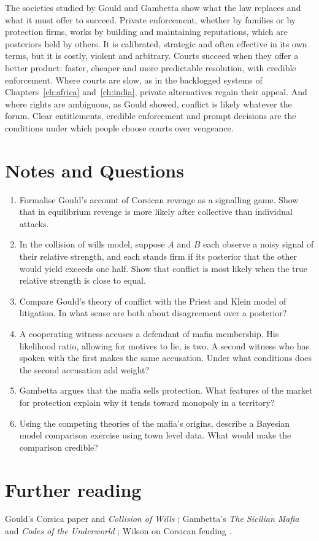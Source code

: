 The societies studied by Gould and Gambetta show what the law replaces and what it must offer to succeed. Private enforcement, whether by families or by protection firms, works by building and maintaining reputations, which are posteriors held by others. It is calibrated, strategic and often effective in its own terms, but it is costly, violent and arbitrary. Courts succeed when they offer a better product: faster, cheaper and more predictable resolution, with credible enforcement. Where courts are slow, as in the backlogged systems of Chapters~\ref{ch:africa} and~\ref{ch:india}, private alternatives regain their appeal. And where rights are ambiguous, as Gould showed, conflict is likely whatever the forum. Clear entitlements, credible enforcement and prompt decisions are the conditions under which people choose courts over vengeance.

\section*{Notes and Questions}
\begin{enumerate}[label=\arabic*.]
\item Formalise Gould's account of Corsican revenge as a signalling game. Show that in equilibrium revenge is more likely after collective than individual attacks.
\item In the collision of wills model, suppose $A$ and $B$ each observe a noisy signal of their relative strength, and each stands firm if its posterior that the other would yield exceeds one half. Show that conflict is most likely when the true relative strength is close to equal.
\item Compare Gould's theory of conflict with the Priest and Klein model of litigation. In what sense are both about disagreement over a posterior?
\item A cooperating witness accuses a defendant of mafia membership. His likelihood ratio, allowing for motives to lie, is two. A second witness who has spoken with the first makes the same accusation. Under what conditions does the second accusation add weight?
\item Gambetta argues that the mafia sells protection. What features of the market for protection explain why it tends toward monopoly in a territory?
\item Using the competing theories of the mafia's origins, describe a Bayesian model comparison exercise using town level data. What would make the comparison credible?
\end{enumerate}

\section*{Further reading}
Gould's Corsica paper \citep{gould2000} and \emph{Collision of Wills} \citep{gould2003}; Gambetta's \emph{The Sicilian Mafia} \citep{gambetta1993} and \emph{Codes of the Underworld} \citep{gambetta2009}; Wilson on Corsican feuding \citep{wilson1988}.
